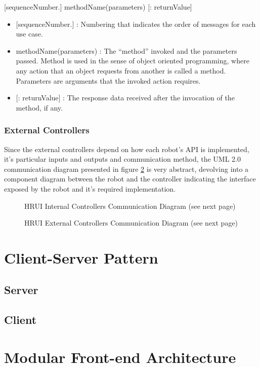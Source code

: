 \centerline{[sequenceNumber.] methodName(parameters) [: returnValue]}
\begin{itemize}
	\item {[}sequenceNumber.{]} : Numbering that indicates the order of messages for each use case.
	\item methodName(parameters) : The ``method'' invoked and the parameters passed. Method is used in the sense of object 
	oriented programming, where any action that an object requests from another is called a method. Parameters are 
	arguments that the invoked action requires.
	\item {[}: returnValue{]} : The response data received after the invocation of the method, if any.
\end{itemize}
\subsubsection{External Controllers}
Since the external controllers depend on how each robot's API is implemented, it's particular inputs and outputs and 
communication method, the UML 2.0 communication diagram presented in figure \ref{extcontrollerarch} is very abstract, 
devolving into a component diagram between the robot and the controller indicating the interface exposed by the robot and 
it's required implementation.
\begin{figure}[H]
\caption{HRUI Internal Controllers Communication Diagram (see next page)\label{controllerarch}}
\end{figure}
\begin{figure}[H]
\caption{HRUI External Controllers Communication Diagram (see next page)\label{extcontrollerarch}}
\end{figure}


\section{Client-Server Pattern} \label{clientserverpattern}
\subsection{Server}
\subsection{Client}
\section{Modular Front-end Architecture} \label{modularfrontendarchitecture}
